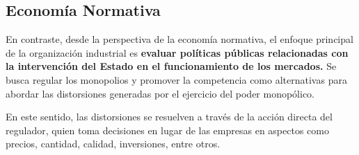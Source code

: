 \documentclass[
  letterpaper,
  DIV=11,
  numbers=noendperiod]{scrartcl}
\begin{document}
\hypertarget{economuxeda-normativa}{%
\subsection{Economía Normativa}\label{economuxeda-normativa}}

En contraste, desde la perspectiva de la economía normativa, el enfoque
principal de la organización industrial es \textbf{evaluar políticas
públicas relacionadas con la intervención del Estado en el
funcionamiento de los mercados.} Se busca regular los monopolios y
promover la competencia como alternativas para abordar las distorsiones
generadas por el ejercicio del poder monopólico.

En este sentido, las distorsiones se resuelven a través de la acción
directa del regulador, quien toma decisiones en lugar de las empresas en
aspectos como precios, cantidad, calidad, inversiones, entre otros.


\printbibliography
\end{document}
